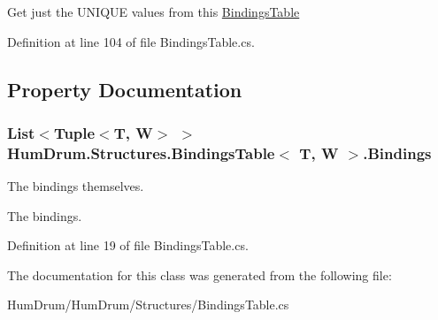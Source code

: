 Get just the U\+N\+I\+Q\+U\+E values from this \hyperlink{classHumDrum_1_1Structures_1_1BindingsTable}{Bindings\+Table} 



Definition at line 104 of file Bindings\+Table.\+cs.



\subsection{Property Documentation}
\hypertarget{classHumDrum_1_1Structures_1_1BindingsTable_af75d299aa8cede939a0b5f0b24244750}{}
\subsubsection[{Bindings}]{\setlength{\rightskip}{0pt plus 5cm}List$<$Tuple$<$T, W$>$ $>$ {\bf Hum\+Drum.\+Structures.\+Bindings\+Table}$<$ T, W $>$.Bindings\hspace{0.3cm}{\ttfamily [get]}}\label{classHumDrum_1_1Structures_1_1BindingsTable_af75d299aa8cede939a0b5f0b24244750}


The bindings themselves. 

The bindings.

Definition at line 19 of file Bindings\+Table.\+cs.



The documentation for this class was generated from the following file\+:\begin{DoxyCompactItemize}
\item 
Hum\+Drum/\+Hum\+Drum/\+Structures/Bindings\+Table.\+cs\end{DoxyCompactItemize}
